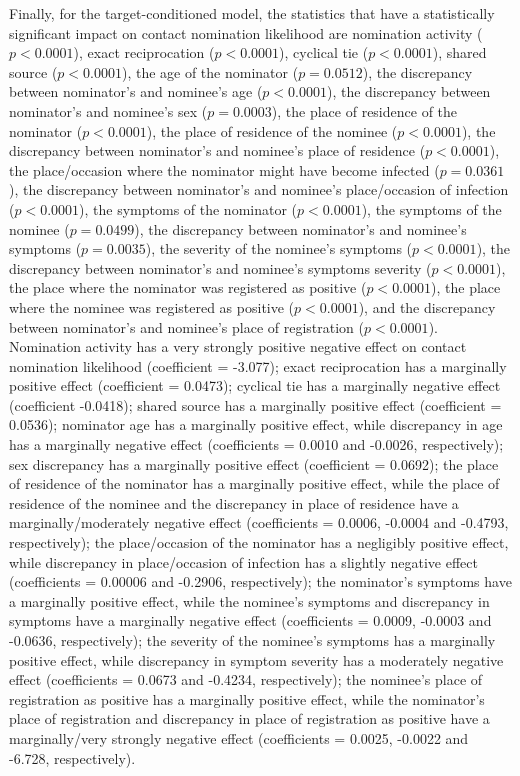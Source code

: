 Finally, for the target-conditioned model, the statistics that have a statistically significant impact on contact nomination likelihood are nomination activity ($p<0.0001$), exact reciprocation ($p<0.0001$), cyclical tie ($p<0.0001$), shared source ($p<0.0001$), the age of the nominator ($p=0.0512$), the discrepancy between nominator's and nominee's age ($p<0.0001$), the discrepancy between nominator's and nominee's sex ($p=0.0003$), the place of residence of the nominator ($p<0.0001$), the place of residence of the nominee ($p<0.0001$), the discrepancy between nominator's and nominee's place of residence ($p<0.0001$), the place/occasion where the nominator might have become infected ($p=0.0361$), the discrepancy between nominator's and nominee's place/occasion of infection ($p<0.0001$), the symptoms of the nominator ($p<0.0001$), the symptoms of the nominee ($p=0.0499$), the discrepancy between nominator's and nominee's symptoms ($p=0.0035$), the severity of the nominee's symptoms ($p<0.0001$), the discrepancy between nominator's and nominee's symptoms severity ($p<0.0001$), the place where the nominator was registered as positive ($p<0.0001$), the place where the nominee was registered as positive ($p<0.0001$), and the discrepancy between nominator's and nominee's place of registration ($p<0.0001$). Nomination activity has a very strongly positive negative effect on contact nomination likelihood (coefficient = -3.077); exact reciprocation has a marginally positive effect (coefficient = 0.0473); cyclical tie has a marginally negative effect (coefficient -0.0418); shared source has a marginally positive effect (coefficient = 0.0536); nominator age has a marginally positive effect, while discrepancy in age has a marginally negative effect (coefficients = 0.0010 and -0.0026, respectively); sex discrepancy has a marginally positive effect (coefficient = 0.0692); the place of residence of the nominator has a marginally positive effect, while the place of residence of the nominee and the discrepancy in place of residence have a marginally/moderately negative effect (coefficients = 0.0006, -0.0004 and -0.4793, respectively); the place/occasion of the nominator has a negligibly positive effect, while discrepancy in place/occasion of infection has a slightly negative effect (coefficients = 0.00006 and -0.2906, respectively); the nominator's symptoms have a marginally positive effect, while the nominee's symptoms and discrepancy in symptoms have a marginally negative effect (coefficients = 0.0009, -0.0003 and -0.0636, respectively); the severity of the nominee's symptoms has a marginally positive effect, while discrepancy in symptom severity has a moderately negative effect (coefficients = 0.0673 and -0.4234, respectively); the nominee's place of registration as positive has a marginally positive effect, while the nominator's place of registration and discrepancy in place of registration as positive have a marginally/very strongly negative effect (coefficients = 0.0025, -0.0022 and -6.728, respectively).

